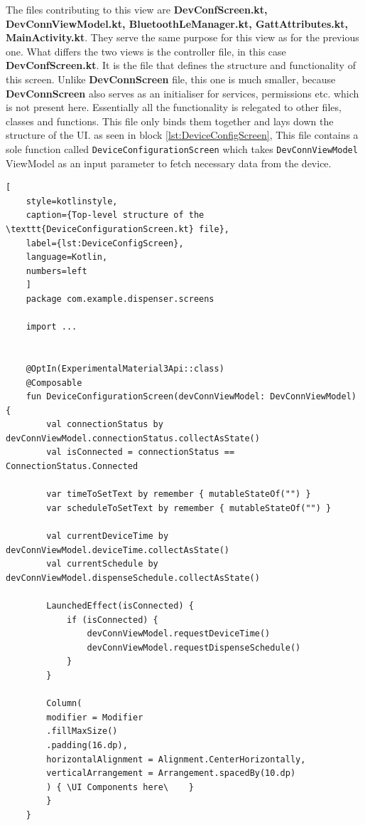 The files contributing to this view are \textbf{DevConfScreen.kt, DevConnViewModel.kt, BluetoothLeManager.kt, GattAttributes.kt, MainActivity.kt}. They serve the same purpose for this view as for the previous one. What differs the two views is the controller file, in this case \textbf{DevConfScreen.kt}. It is the file that defines the structure and functionality of this screen. Unlike \textbf{DevConnScreen} file, this one is much smaller, because \textbf{DevConnScreen} also serves as an initialiser for services, permissions etc. which is not present here. Essentially all the functionality is relegated to other files, classes and functions. This file only binds them together and lays down the structure of the \ac{UI}. as seen in block \ref{lst:DeviceConfigScreen}, This file contains a sole function called \texttt{DeviceConfigurationScreen} which takes \texttt{DevConnViewModel} ViewModel as an input parameter to fetch necessary data from the device.
\begin{lstlisting}[
	style=kotlinstyle,
	caption={Top-level structure of the \texttt{DeviceConfigurationScreen.kt} file},
	label={lst:DeviceConfigScreen},
	language=Kotlin,
	numbers=left
	]
	package com.example.dispenser.screens
	
	import ...

	
	@OptIn(ExperimentalMaterial3Api::class)
	@Composable
	fun DeviceConfigurationScreen(devConnViewModel: DevConnViewModel) {
		val connectionStatus by devConnViewModel.connectionStatus.collectAsState()
		val isConnected = connectionStatus == ConnectionStatus.Connected
		
		var timeToSetText by remember { mutableStateOf("") }
		var scheduleToSetText by remember { mutableStateOf("") }
		
		val currentDeviceTime by devConnViewModel.deviceTime.collectAsState()
		val currentSchedule by devConnViewModel.dispenseSchedule.collectAsState()
		
		LaunchedEffect(isConnected) {
			if (isConnected) {
				devConnViewModel.requestDeviceTime()
				devConnViewModel.requestDispenseSchedule()
			}
		}
		
		Column(
		modifier = Modifier
		.fillMaxSize()
		.padding(16.dp),
		horizontalAlignment = Alignment.CenterHorizontally,
		verticalArrangement = Arrangement.spacedBy(10.dp)
		) { \UI Components here\	}
		}
	}
\end{lstlisting}

